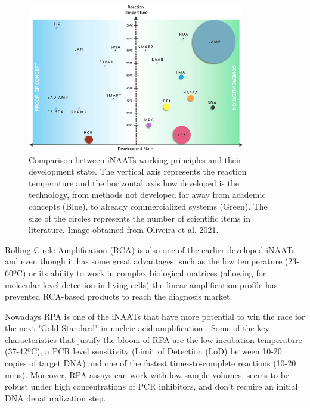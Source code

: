 \begin{figure}[b]
    \centering
    \includegraphics[width=0.85\textwidth]{figures/commercial kits.jpg}
    \caption{Comparison between iNAATs working principles and their development state. The vertical axis represents the reaction temperature and the horizontal axis how developed is the technology, from methods not developed far away from academic concepts (Blue), to already commercialized systems (Green). The size of the circles represents the number of scientific items in literature. Image obtained from Oliveira et al. 2021\cite{oliveira_isothermal_2021}.}
    \label{fig:development state}
\end{figure}

Rolling Circle Amplification (RCA) is also one of the earlier developed iNAATs \cite{fire_rolling_1995} and even though it has some great advantages, such as the low temperature (23-60ºC) or its ability to work in complex biological matrices (allowing for molecular-level detection in living cells\cite{konry_ultrasensitive_2011}) the linear amplification profile has prevented RCA-based products to reach the diagnosis market.

Nowadays RPA is one of the iNAATs that have more potential to win the race for the next "Gold Standard" in nucleic acid amplification \cite{oliveira_isothermal_2021}. Some of the key characteristics that justify the bloom of RPA are the low incubation temperature (37-42ºC), a PCR level sensitivity (Limit of Detection (LoD) between 10-20 copies of target DNA) and one of the fastest times-to-complete reactions (10-20 mins)\cite{kunze_-chip_2016}. Moreover, RPA assays can work with low sample volumes, seems to be robust under high concentrations of PCR inhibitors, and don't require an initial DNA denaturalization step\cite{twist_dx_recombinase_2017}\cite{kersting_rapid_2014}\cite{deng_bioanalytical_2015-1}.

